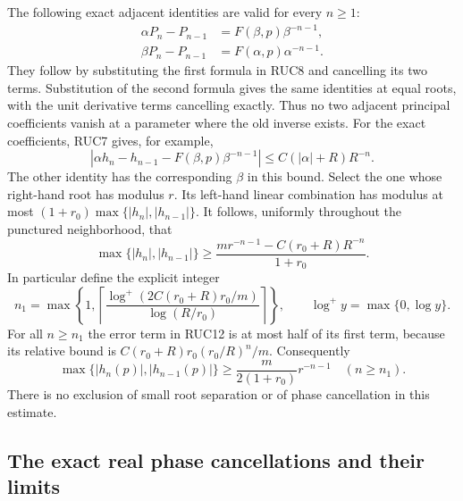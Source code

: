 \documentclass[11pt]{article}
\begin{document}
The following exact adjacent identities are valid for every $n\ge1$:
\[
 \begin{aligned}
 \alpha P_n-P_{n-1}&=F(\beta,p)\beta^{-n-1},\\
 \beta P_n-P_{n-1}&=F(\alpha,p)\alpha^{-n-1}.
 \end{aligned}\tag{RUC10}
\]
They follow by substituting the first formula in RUC8 and
cancelling its two terms.  Substitution of the second formula
gives the same identities at equal roots, with the unit derivative
terms cancelling exactly.  Thus no two adjacent principal
coefficients vanish at a parameter where the old inverse exists.
For the exact coefficients, RUC7 gives, for example,
\[
 |\alpha h_n-h_{n-1}-F(\beta,p)\beta^{-n-1}|
       \le C(|\alpha|+R)R^{-n}.
 \tag{RUC11}
\]
The other identity has the corresponding $\beta$ in this bound.
Select the one whose right-hand root has modulus $r$.
Its left-hand linear combination has modulus at most
$(1+r_0)\max\{|h_n|,|h_{n-1}|\}$.
It follows, uniformly throughout the punctured neighborhood, that
\[
 \max\{|h_n|,|h_{n-1}|\}
 \ge\frac{m r^{-n-1}-C(r_0+R)R^{-n}}{1+r_0}.
 \tag{RUC12}
\]
In particular define the explicit integer
\[
 n_1=\max\left\{1,
  \left\lceil\frac{\log^+(2C(r_0+R)r_0/m)}{\log(R/r_0)}\right\rceil
              \right\},\qquad \log^+y=\max\{0,\log y\}.
\]
For all $n\ge n_1$ the error term in RUC12 is at most half of
its first term, because its relative bound is
$C(r_0+R)r_0(r_0/R)^n/m$.  Consequently
\[
 \max\{|h_n(p)|,|h_{n-1}(p)|\}
       \ge\frac{m}{2(1+r_0)}r^{-n-1}\quad(n\ge n_1).
 \tag{RUC13}
\]
There is no exclusion of small root separation or of phase
cancellation in this estimate.

\subsection{The exact real phase cancellations and their limits}
\end{document}
